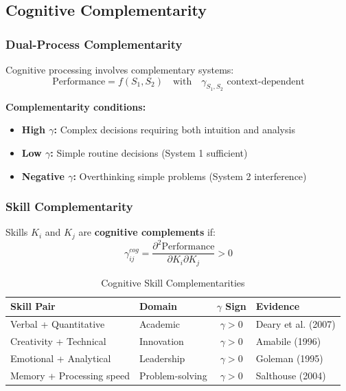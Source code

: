 \subsection{Cognitive Complementarity}

\subsubsection{Dual-Process Complementarity}

\begin{tcolorbox}[colback=purple!5!white,colframe=purple!75!black,title=\textbf{Kahneman's System 1/System 2 Complementarity}]
Cognitive processing involves complementary systems:
\begin{equation}
\text{Performance} = f(S_1, S_2) \quad \text{with} \quad \gamma_{S_1,S_2} \text{ context-dependent}
\end{equation}

\textbf{Complementarity conditions:}
\begin{itemize}[noitemsep]
    \item \textbf{High $\gamma$:} Complex decisions requiring both intuition and analysis
    \item \textbf{Low $\gamma$:} Simple routine decisions (System 1 sufficient)
    \item \textbf{Negative $\gamma$:} Overthinking simple problems (System 2 interference)
\end{itemize}
\end{tcolorbox}

\subsubsection{Skill Complementarity}

\begin{definition}
Skills $K_i$ and $K_j$ are \textbf{cognitive complements} if:
\begin{equation}
\gamma^{cog}_{ij} = \frac{\partial^2 \text{Performance}}{\partial K_i \partial K_j} > 0
\end{equation}
\end{definition}

\begin{table}[h]
\centering
\caption{Cognitive Skill Complementarities}
\label{tab:cognitive-gamma}
\renewcommand{\arraystretch}{1.2}
\begin{tabular}{@{}llcl@{}}
\toprule
\textbf{Skill Pair} & \textbf{Domain} & \textbf{$\gamma$ Sign} & \textbf{Evidence} \\
\midrule
Verbal + Quantitative & Academic & $\gamma > 0$ & Deary et al. (2007) \\
Creativity + Technical & Innovation & $\gamma > 0$ & Amabile (1996) \\
Emotional + Analytical & Leadership & $\gamma > 0$ & Goleman (1995) \\
Memory + Processing speed & Problem-solving & $\gamma > 0$ & Salthouse (2004) \\
\bottomrule
\end{tabular}
\end{table}

